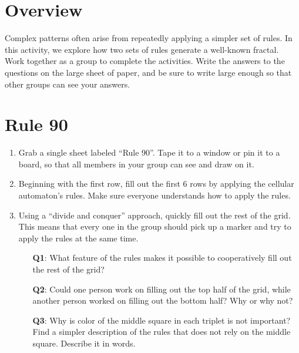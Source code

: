 \documentclass{article}
\begin{document}
\section*{Overview}

Complex patterns often arise from repeatedly applying a simpler set of rules.
In this activity, we explore how two sets of rules generate a well-known fractal.\\

\noindent Work together as a group to complete the activities. Write the
answers to the questions on the large sheet of paper, and be sure to write
large enough  so that other groups can see your answers.

\section*{Rule 90}

\begin{enumerate}
	\item Grab a single sheet labeled ``Rule 90''. Tape it to a window or pin
	it to a board, so that all members in your group can see and draw on it.

	\item Beginning with the first row, fill out the first $6$ rows by applying
	the cellular automaton's rules. Make sure everyone understands how to
	apply the rules.

	\item Using a ``divide and conquer'' approach, quickly fill out the rest
	of the grid. This means that every one in the group should pick up a marker
	and try to apply the rules at the same time.

		\begin{itemize}
		\item[\textbf{Q1}:] What feature of the rules makes it possible to cooperatively
		fill out the rest of the grid?

		\item[\textbf{Q2}:] Could one person work on filling out the top half of the grid,
		while another person worked on filling out the bottom half?
		Why or why not?

		\item[\textbf{Q3}:] Why is color of the middle square in each triplet
  is not important? Find a simpler description of the rules that does not rely on
  the middle square. Describe it in words.

		\end{itemize}

\end{enumerate}
\end{document}
